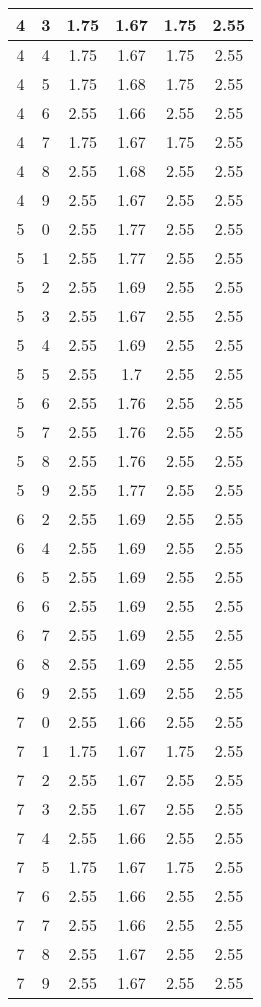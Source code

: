 \begin{longtable}{|c|c||c||c||c|c|}
	4 & 3 & 1.75 & 1.67 & 1.75 & 2.55 \\ \hline
	4 & 4 & 1.75 & 1.67 & 1.75 & 2.55 \\ \hline
	4 & 5 & 1.75 & 1.68 & 1.75 & 2.55 \\ \hline
	4 & 6 & 2.55 & 1.66 & 2.55 & 2.55 \\ \hline
	4 & 7 & 1.75 & 1.67 & 1.75 & 2.55 \\ \hline
	4 & 8 & 2.55 & 1.68 & 2.55 & 2.55 \\ \hline
	4 & 9 & 2.55 & 1.67 & 2.55 & 2.55 \\ \hline
	5 & 0 & 2.55 & 1.77 & 2.55 & 2.55 \\ \hline
	5 & 1 & 2.55 & 1.77 & 2.55 & 2.55 \\ \hline
	5 & 2 & 2.55 & 1.69 & 2.55 & 2.55 \\ \hline
	5 & 3 & 2.55 & 1.67 & 2.55 & 2.55 \\ \hline
	5 & 4 & 2.55 & 1.69 & 2.55 & 2.55 \\ \hline
	5 & 5 & 2.55 & 1.7 & 2.55 & 2.55 \\ \hline
	5 & 6 & 2.55 & 1.76 & 2.55 & 2.55 \\ \hline
	5 & 7 & 2.55 & 1.76 & 2.55 & 2.55 \\ \hline
	5 & 8 & 2.55 & 1.76 & 2.55 & 2.55 \\ \hline
	5 & 9 & 2.55 & 1.77 & 2.55 & 2.55 \\ \hline
	6 & 2 & 2.55 & 1.69 & 2.55 & 2.55 \\ \hline
	6 & 4 & 2.55 & 1.69 & 2.55 & 2.55 \\ \hline
	6 & 5 & 2.55 & 1.69 & 2.55 & 2.55 \\ \hline
	6 & 6 & 2.55 & 1.69 & 2.55 & 2.55 \\ \hline
	6 & 7 & 2.55 & 1.69 & 2.55 & 2.55 \\ \hline
	6 & 8 & 2.55 & 1.69 & 2.55 & 2.55 \\ \hline
	6 & 9 & 2.55 & 1.69 & 2.55 & 2.55 \\ \hline
	7 & 0 & 2.55 & 1.66 & 2.55 & 2.55 \\ \hline
	7 & 1 & 1.75 & 1.67 & 1.75 & 2.55 \\ \hline
	7 & 2 & 2.55 & 1.67 & 2.55 & 2.55 \\ \hline
	7 & 3 & 2.55 & 1.67 & 2.55 & 2.55 \\ \hline
	7 & 4 & 2.55 & 1.66 & 2.55 & 2.55 \\ \hline
	7 & 5 & 1.75 & 1.67 & 1.75 & 2.55 \\ \hline
	7 & 6 & 2.55 & 1.66 & 2.55 & 2.55 \\ \hline
	7 & 7 & 2.55 & 1.66 & 2.55 & 2.55 \\ \hline
	7 & 8 & 2.55 & 1.67 & 2.55 & 2.55 \\ \hline
	7 & 9 & 2.55 & 1.67 & 2.55 & 2.55 \\ \hline
\end{longtable}
